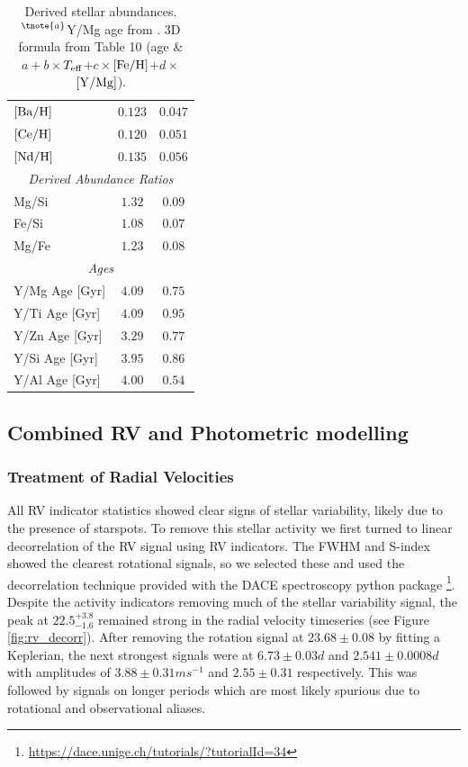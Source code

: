 \documentclass[fleqn,usenatbib]{mnras}
\newcommand{\teff}{$T_{\rm eff}$}
\newcommand{\feh}{\mbox{$\rm [Fe/H]$}}
\newcommand{\ymg}{\mbox{$\rm [Y/Mg]$}}
\newcommand{\Tperiod}{ $ 22.5^{+3.8}_{-1.6} $ }
\begin{document}
\begin{table}
\begin{tabular}{lcc}
        $[\rm{Ba}/\rm{H}]$ & $   0.123 $ & $  0.047 $ \\
        $[\rm{Ce}/\rm{H}]$ & $   0.120 $ & $  0.051 $ \\
        $[\rm{Nd}/\rm{H}]$ & $   0.135 $ & $  0.056 $ \\
        \hline
        \multicolumn{3}{c}{\it Derived Abundance Ratios}\\
        Mg/Si & $   1.32 $ & $ 0.09 $ \\
        Fe/Si & $   1.08 $ & $ 0.07 $ \\
        Mg/Fe & $   1.23 $ & $ 0.08 $ \\
        \hline
        \multicolumn{3}{c}{\it Ages}\\
        Y/Mg Age [Gyr]  & $ 4.09 $ & $ 0.75 $ \\
        Y/Ti Age [Gyr]  & $ 4.09 $ & $ 0.95 $ \\
        Y/Zn Age [Gyr]  & $ 3.29 $ & $ 0.77 $ \\
        Y/Si Age [Gyr]  & $ 3.95 $ & $ 0.86 $ \\
        Y/Al Age [Gyr]  & $ 4.00 $ & $ 0.54 $ \\
        \hline
        \hline
    \end{tabular}
    \caption{Derived stellar abundances. $^{\tnote{a}}$Y/Mg age from \citet{Delgado-19}. 3D formula from Table 10 (age \&  $a + b \times$\teff{}$+ c \times$\feh{}$ + d \times$\ymg{}).}
    \label{tab:abunds}
\end{table}


\subsection{Combined RV and Photometric modelling}

\subsubsection{Treatment of Radial Velocities}
All RV indicator statistics showed clear signs of stellar variability, likely due to the presence of starspots.
To remove this stellar activity we first turned to linear decorrelation of the RV signal using RV indicators.
The FWHM and S-index showed the clearest rotational signals, so we selected these and used the decorrelation technique provided with the DACE spectroscopy python package \citep{2015ASPC..495....7B}\footnote{\url{https://dace.unige.ch/tutorials/?tutorialId=34}}.
Despite the activity indicators removing much of the stellar variability signal, the peak at \Tperiod{} remained strong in the radial velocity timeseries (see Figure \ref{fig:rv_decorr}).
After removing the rotation signal at $23.68\pm0.08$ by fitting a Keplerian, the next strongest signals were at $6.73\pm0.03d$ and $2.541\pm0.0008d$ with amplitudes of $3.88\pm0.31 ms^{-1}$ and $2.55\pm0.31$ respectively. This was followed by signals on longer periods which are most likely spurious due to rotational and observational aliases.
\end{document}
